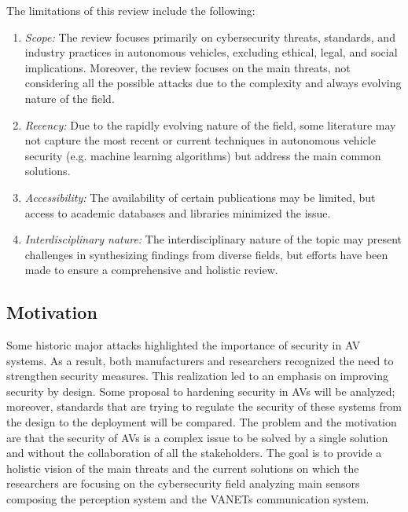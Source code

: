 The limitations of this review include the following:
\begin{enumerate}
    \item \textit{Scope:} The review focuses primarily on cybersecurity threats, standards, and industry practices in autonomous vehicles, excluding ethical, legal, and social implications.
    Moreover, the review focuses on the main threats, not considering all the possible attacks due to the complexity and always evolving nature of the field.
    \item \textit{Recency:} Due to the rapidly evolving nature of the field, some literature may not capture the most recent or current techniques in autonomous vehicle security (e.g. machine learning algorithms) but address the main common solutions.
    \item \textit{Accessibility:} The availability of certain publications may be limited, but access to academic databases and libraries minimized the issue.
    \item \textit{Interdisciplinary nature:} The interdisciplinary nature of the topic may present challenges in synthesizing findings from diverse fields, but efforts have been made to ensure a comprehensive and holistic review.
\end{enumerate}

\subsection{Motivation}\label{subsec:motivation}

Some historic major attacks highlighted the importance of security in AV systems.
As a result, both manufacturers and researchers recognized the need to strengthen security measures.
This realization led to an emphasis on improving security by design.
Some proposal to hardening security in AVs will be analyzed; moreover, standards that are trying to regulate the security of these systems from the design to the deployment will be compared.
The problem and the motivation are that the security of AVs is a complex issue to be solved by a single solution and without the collaboration of all the stakeholders\cite{comparison-standard}.
The goal is to provide a holistic vision of the main threats and the current solutions on which the researchers are focusing on the cybersecurity field
analyzing main sensors composing the perception system and the VANETs communication system.

\newpage

